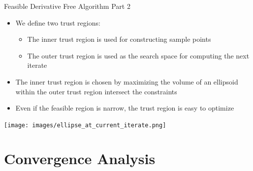 \documentclass{beamer}
\begin{document}
\begin{frame}{Feasible Derivative Free Algorithm Part 2}
    \begin{itemize}
        \item We define two trust regions:
        \begin{itemize}
            \item The inner trust region is used for constructing sample points
            \item The outer trust region is used as the search space for computing the next iterate
        \end{itemize}
        \item The inner trust region is chosen by maximizing the volume of an ellipsoid within the outer trust region intersect the constraints
        \item Even if the feasible region is narrow, the trust region is easy to optimize
    \end{itemize}
\end{frame}


\begin{frame}{}
\texttt{[image: images/ellipse\_at\_current\_iterate.png]}
\end{frame}


\section{Convergence Analysis}

\end{document}
